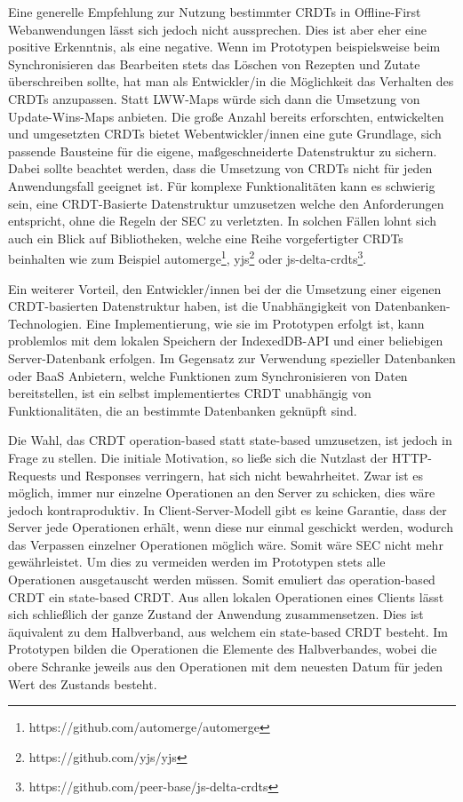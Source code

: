 \documentclass[a4paper, 12pt]{scrreprt}
\begin{document}
Eine generelle Empfehlung zur Nutzung bestimmter CRDTs in Offline-First Webanwendungen lässt sich jedoch nicht aussprechen. Dies ist aber eher eine positive Erkenntnis, als eine negative. Wenn im Prototypen beispielsweise beim Synchronisieren das Bearbeiten stets das Löschen von Rezepten und Zutate überschreiben sollte, hat man als Entwickler/in die Möglichkeit das Verhalten des CRDTs anzupassen. Statt LWW-Maps würde sich dann die Umsetzung von Update-Wins-Maps anbieten. Die große Anzahl bereits erforschten, entwickelten und umgesetzten CRDTs bietet Webentwickler/innen eine gute Grundlage, sich passende Bausteine für die eigene, maßgeschneiderte Datenstruktur zu sichern. Dabei sollte beachtet werden, dass die Umsetzung von CRDTs nicht für jeden Anwendungsfall geeignet ist. Für komplexe Funktionalitäten kann es schwierig sein, eine CRDT-Basierte Datenstruktur umzusetzen welche den Anforderungen entspricht, ohne die Regeln der \ac{SEC} zu verletzten. In solchen Fällen lohnt sich auch ein Blick auf Bibliotheken, welche eine Reihe vorgefertigter CRDTs beinhalten wie zum Beispiel automerge\footnote{https://github.com/automerge/automerge}, yjs\footnote{https://github.com/yjs/yjs} oder js-delta-crdts\footnote{https://github.com/peer-base/js-delta-crdts}. 

Ein weiterer Vorteil, den Entwickler/innen bei der die Umsetzung einer eigenen CRDT-basierten Datenstruktur haben, ist die Unabhängigkeit von Datenbanken-Technologien. Eine Implementierung, wie sie im Prototypen erfolgt ist, kann problemlos mit dem lokalen Speichern der IndexedDB-API und einer beliebigen Server-Datenbank erfolgen. Im Gegensatz zur Verwendung spezieller Datenbanken oder \ac{BaaS} Anbietern, welche Funktionen zum Synchronisieren von Daten bereitstellen, ist ein selbst implementiertes CRDT unabhängig von Funktionalitäten, die an bestimmte Datenbanken geknüpft sind.

Die Wahl, das CRDT operation-based statt state-based umzusetzen, ist jedoch in Frage zu stellen. Die initiale Motivation, so ließe sich die Nutzlast der HTTP-Requests und Responses verringern, hat sich nicht bewahrheitet. Zwar ist es möglich, immer nur einzelne Operationen an den Server zu schicken, dies wäre jedoch kontraproduktiv. In Client-Server-Modell gibt es keine Garantie, dass der Server jede Operationen erhält, wenn diese nur einmal geschickt werden, wodurch das Verpassen einzelner Operationen möglich wäre. Somit wäre \ac{SEC} nicht mehr gewährleistet. Um dies zu vermeiden werden im Prototypen stets alle Operationen ausgetauscht werden müssen. Somit emuliert das operation-based CRDT ein state-based CRDT. Aus allen lokalen Operationen eines Clients lässt sich schließlich der ganze Zustand der Anwendung zusammensetzen. Dies ist äquivalent zu dem Halbverband, aus welchem ein state-based CRDT besteht. Im Prototypen bilden die Operationen die Elemente des Halbverbandes, wobei die obere Schranke jeweils aus den Operationen mit dem neuesten Datum für jeden Wert des Zustands besteht.
\end{document}
